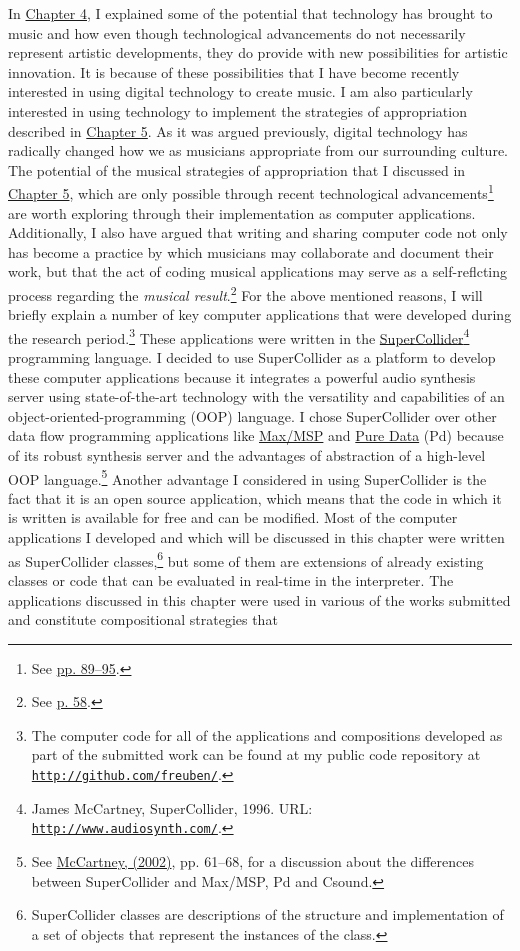 In \hyperlink{chapter4}{Chapter 4}, I explained some of the potential that technology has brought to music and how even though technological advancements do not necessarily represent artistic developments, they do provide with new possibilities for artistic innovation. It is because of these possibilities that I have become recently interested in using digital technology to create music. I am also particularly interested in using technology to implement the strategies of appropriation described in \hyperlink{chapter5}{Chapter 5}. As it was argued previously, digital technology has radically changed how we as musicians appropriate from our surrounding culture. The potential of the musical strategies of appropriation that I discussed in \hyperlink{chapter5}{Chapter 5}, which are only possible through recent technological advancements\footnote{See \hyperlink{elaborationapprop}{pp. 89--95}.} are worth exploring through their implementation as computer applications. Additionally, I also have argued that writing and sharing computer code not only has become a practice by which musicians may collaborate and document their work, but that the act of coding musical applications may serve as a self-reflcting process regarding the \emph{musical result}.\footnote{See \hyperlink{codingcons}{p. 58}.} For the above mentioned reasons, I will briefly explain a number of key computer applications that were developed during the research period.\footnote{The computer code for all of the applications and compositions developed as part of the submitted work can be found at my public code repository at \href{http://github.com/freuben/}{\texttt{http://github.com/freuben/}}.} These applications were written in the \href{http://www.audiosynth.com/}{\mbox{SuperCollider}}\footnote{James McCartney, SuperCollider, 1996. URL: \href{http://www.audiosynth.com/}{\texttt{http://www.audiosynth.com/}}.} programming language. I decided to use SuperCollider as a platform to develop these computer applications because it integrates a powerful audio synthesis server using state-of-the-art technology with the versatility and capabilities of an object-oriented-programming (OOP) language. I chose SuperCollider over other data flow programming applications like \href{http://www.cycling74.com/}{Max/MSP} and \href{http://puredata.info/}{Pure Data} (Pd) because of its robust synthesis server and the advantages of abstraction of a high-level OOP language.\footnote{See \hyperlink{mccartney}{McCartney, (2002)}, pp. 61--68, for a discussion about the differences between SuperCollider and Max/MSP, Pd and Csound.} Another advantage I considered in using SuperCollider is the fact that it is an open source application, which means that the code in which it is written is available for free and can be modified. Most of the computer applications I developed and which will be discussed in this chapter were written as SuperCollider classes,\footnote{SuperCollider classes are descriptions of the structure and implementation of a set of objects that represent the instances of the class.} but some of them are extensions of already existing classes or code that can be evaluated in real-time in the interpreter. The applications discussed in this chapter were used in various of the works submitted and constitute compositional strategies that 